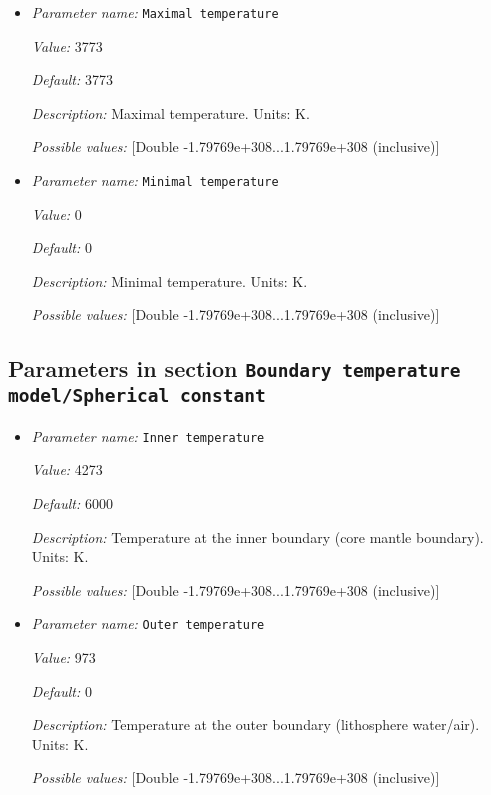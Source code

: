 \begin{itemize}
\item {\it Parameter name:} {\tt Maximal temperature}
\label{parameters:Boundary temperature model/Initial temperature/Maximal temperature}


{\it Value:} 3773


{\it Default:} 3773


{\it Description:} Maximal temperature. Units: K.


{\it Possible values:} [Double -1.79769e+308...1.79769e+308 (inclusive)]
\item {\it Parameter name:} {\tt Minimal temperature}
\label{parameters:Boundary temperature model/Initial temperature/Minimal temperature}


{\it Value:} 0


{\it Default:} 0


{\it Description:} Minimal temperature. Units: K.


{\it Possible values:} [Double -1.79769e+308...1.79769e+308 (inclusive)]
\end{itemize}

\subsection{Parameters in section \tt Boundary temperature model/Spherical constant}
\label{parameters:Boundary_20temperature_20model/Spherical_20constant}

\begin{itemize}
\item {\it Parameter name:} {\tt Inner temperature}
\label{parameters:Boundary temperature model/Spherical constant/Inner temperature}


{\it Value:} 4273


{\it Default:} 6000


{\it Description:} Temperature at the inner boundary (core mantle boundary). Units: K.


{\it Possible values:} [Double -1.79769e+308...1.79769e+308 (inclusive)]
\item {\it Parameter name:} {\tt Outer temperature}
\label{parameters:Boundary temperature model/Spherical constant/Outer temperature}


{\it Value:} 973


{\it Default:} 0


{\it Description:} Temperature at the outer boundary (lithosphere water/air). Units: K.


{\it Possible values:} [Double -1.79769e+308...1.79769e+308 (inclusive)]
\end{itemize}

